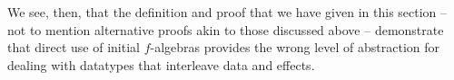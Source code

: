 \documentclass{jfp1}
\newcommand{\thmref}[1]{\hyperref[#1]{Theorem \ref*{#1}}}
\begin{document}

We see, then, that the definition and proof that we have given in this
section -- not to mention alternative proofs akin to those discussed
above -- demonstrate that direct use of initial $f$-algebras provides
the wrong level of abstraction for dealing with datatypes that
interleave data and effects.

\end{document}
